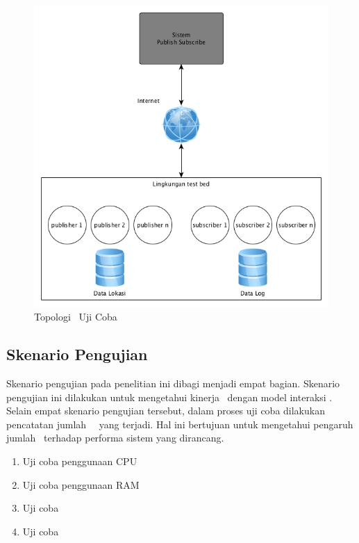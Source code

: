 \noindent
\begin{figure}
  \centering
  \includegraphics[scale=0.70]
	{images/4-testbed}
	\caption{Topologi \Testbed~Uji Coba}
\label{fig:testbed}
\end{figure}


\subsection{Skenario Pengujian}

Skenario pengujian pada penelitian ini dibagi menjadi empat bagian. Skenario
pengujian ini dilakukan untuk mengetahui kinerja \tracking~dengan model
interaksi \pubsub. Selain empat skenario pengujian tersebut, dalam proses uji
coba dilakukan pencatatan jumlah \event~\publish~yang terjadi. Hal ini bertujuan
untuk mengetahui pengaruh jumlah \publish~terhadap performa sistem yang
dirancang.

\begin{enumerate}
  [label=\alph*.
  ,noitemsep
  ,nolistsep
  ,leftmargin=0cm
  ,itemindent=.5cm
  ,listparindent=\parindent
  ]

	\item Uji coba penggunaan CPU \server
	\item Uji coba penggunaan RAM \server
  \item Uji coba \bandwidth
  \item Uji coba \latency

\end{enumerate}

